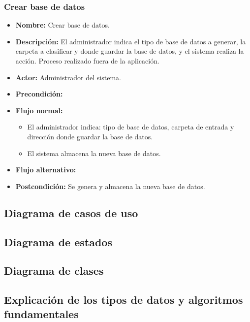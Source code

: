 \newpage

\subsubsection{Crear base de datos}

\begin{itemize}
\item \textbf{Nombre: }Crear base de datos.
\item \textbf{Descripción: }El administrador indica el tipo de base de datos a generar, la carpeta a clasificar y donde guardar la base de datos, y el sistema realiza la acción. Proceso realizado fuera de la aplicación.
\item \textbf{Actor: }Administrador del sistema.
\item \textbf{Precondición: }
\item \textbf{Flujo normal: }
\begin{itemize}
\item El administrador indica: tipo de base de datos, carpeta de entrada y dirección donde guardar la base de datos.
\item El sistema almacena la nueva base de datos.
\end{itemize}
\item \textbf{Flujo alternativo:}
\item \textbf{Postcondición: } Se genera y almacena la nueva base de datos.
\end{itemize}

\newpage

\subsection{Diagrama de casos de uso}

\subsection{Diagrama de estados}

\subsection{Diagrama de clases}

\subsection{Explicación de los tipos de datos y algoritmos fundamentales}